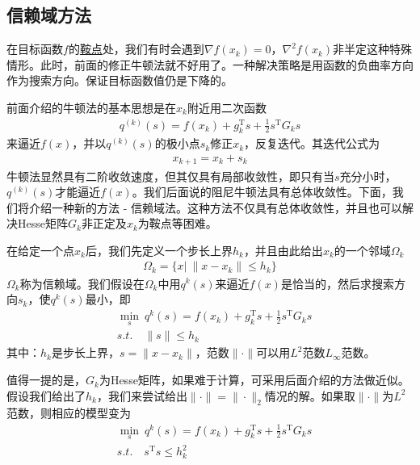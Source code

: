     \subsection{信赖域方法}
        在目标函数$f$的\underline{鞍点}处，我们有时会遇到$\nabla f(x_k)=0$，$\nabla^2 f(x_k)$非半定这种特殊情形。此时，前面的修正牛顿法就不好用了。一种解决策略是用函数的负曲率方向作为搜索方向。保证目标函数值仍是下降的。
        \par
        前面介绍的牛顿法的基本思想是在$x_k$附近用二次函数
        \begin{align*}
        q^{(k)}(s) = f(x_k)+g_k^\mathrm{T}  s+\frac 12 s^\mathrm{T}  G_k s
        \end{align*}
        来逼近$f(x)$，并以$q^{(k)}(s)$的极小点$s_k$修正$x_k$，反复迭代。其迭代公式为
        \begin{align*}
        x_{k+1} =x_k+s_k
        \end{align*}
        牛顿法显然具有二阶收敛速度，但其仅具有局部收敛性，即只有当$s$充分小时，$q^{(k)}(s)$才能逼近$f(x)$。我们后面说的阻尼牛顿法具有总体收敛性。下面，我们将介绍一种新的方法 - 信赖域法。这种方法不仅具有总体收敛性，并且也可以解决Hesse矩阵$G_k$非正定及$x_k$为鞍点等困难。
        \par
        在给定一个点$x_k$后，我们先定义一个步长上界$h_k$，并且由此给出$x_k$的一个邻域${\Omega}_k$
         \begin{align*}
        {\Omega}_k =\{x|\ \|x-x_k\| \leqslant h_k\}
        \end{align*}
        ${\Omega}_k$称为信赖域。我们假设在${\Omega}_k$中用$q^k(s)$来逼近$f(x)$是恰当的，然后求搜索方向$s_k$，使$q^k(s)$最小，即
         \begin{align*}
        & \mathop {\min} \limits_s \ q^k (s)=f(x_k)+g^\mathrm{T} _k s+\frac 12 s^\mathrm{T} G_ks \\
        & s.t.\quad  \|s\| \leqslant h_k
        \end{align*}
        其中：$h_k$是步长上界，$s = \|x-x_k\|$，范数$\| \cdot \|$可以用$L^2$范数$L_\infty$范数。
        \par
        值得一提的是，$G_k$为Hesse矩阵，如果难于计算，可采用后面介绍的方法做近似。假设我们给出了$h_k$，我们来尝试给出$\| \cdot \|=\|\cdot\|_2$情况的解。如果取$\| \cdot \|$为$L^2$范数，则相应的模型变为
        \begin{align*}
        & \mathop {\min} \limits_s \ q^k (s)=f(x_k)+g^\mathrm{T} _k s+\frac 12 s^\mathrm{T} G_ks \\
        & s.t. \quad s^\mathrm{T} s \leqslant h_k^2
        \end{align*}
